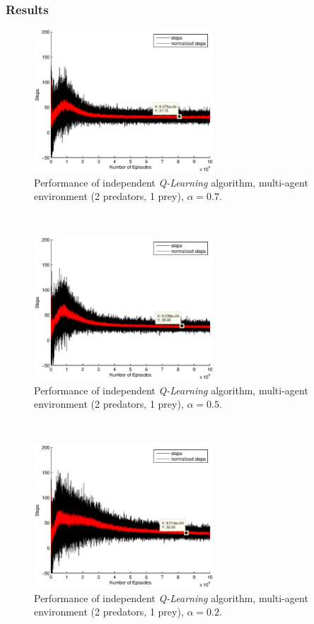 \documentclass[a4paper,11pt]{article}
\begin{document}
\subsubsection{Results}

\begin{figure}[ht!]
  \centering
    \includegraphics[width=0.6\textwidth]{figures/q207.eps}
    \caption{Performance of independent \textit{Q-Learning} algorithm, multi-agent environment (2 predators, 1 prey), $\alpha = 0.7$.}
    \label{q21}
\end{figure}
~
\begin{figure}[ht!]
  \centering
	\includegraphics[width=0.6\textwidth]{figures/q205.eps}
   \caption{Performance of independent \textit{Q-Learning} algorithm, multi-agent environment (2 predators, 1 prey), $\alpha = 0.5$.}
    \label{q22}
\end{figure}
~
\begin{figure}[ht!]
  \centering
	\includegraphics[width=0.6\textwidth]{figures/q202.eps}
    \caption{Performance of independent \textit{Q-Learning} algorithm, multi-agent environment (2 predators, 1 prey), $\alpha = 0.2$.}
    \label{q23}
\end{figure}
\end{document}
